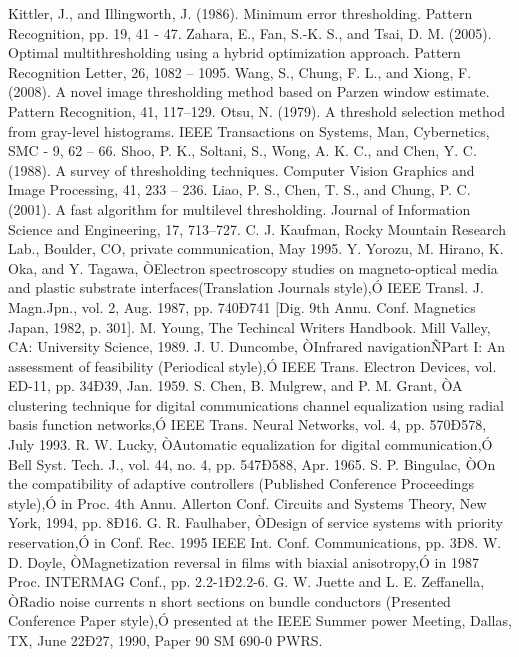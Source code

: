 \documentclass[a4paper, 10pt, conference]{ieeeconf}
\begin{document}
\begin{thebibliography}{99}

 Kittler, J., and Illingworth, J. (1986). Minimum error thresholding. Pattern Recognition, pp. 19, 41 - 47. 
 Zahara, E., Fan, S.-K. S., and Tsai, D. M. (2005). Optimal multithresholding using a hybrid optimization approach. Pattern Recognition Letter, 26, 1082 – 1095.
 Wang, S., Chung, F. L., and Xiong, F. (2008). A novel image thresholding method based on Parzen window estimate. Pattern Recognition, 41, 117–129.
 Otsu, N. (1979). A threshold selection method from gray-level histograms. IEEE Transactions on Systems, Man, Cybernetics, SMC - 9, 62 – 66.
 Shoo, P. K., Soltani, S., Wong, A. K. C., and Chen, Y. C. (1988). A survey of thresholding techniques. Computer Vision Graphics and Image Processing, 41, 233 – 236.
 Liao, P. S., Chen, T. S., and Chung, P. C. (2001). A fast algorithm for multilevel thresholding. Journal of Information Science and Engineering, 17, 713–727.
 C. J. Kaufman, Rocky Mountain Research Lab., Boulder, CO, private communication, May 1995.
 Y. Yorozu, M. Hirano, K. Oka, and Y. Tagawa, ÒElectron spectroscopy studies on magneto-optical media and plastic substrate interfaces(Translation Journals style),Ó IEEE Transl. J. Magn.Jpn., vol. 2, Aug. 1987, pp. 740Ð741 [Dig. 9th Annu. Conf. Magnetics Japan, 1982, p. 301].
 M. Young, The Techincal Writers Handbook.  Mill Valley, CA: University Science, 1989.
 J. U. Duncombe, ÒInfrared navigationÑPart I: An assessment of feasibility (Periodical style),Ó IEEE Trans. Electron Devices, vol. ED-11, pp. 34Ð39, Jan. 1959.
 S. Chen, B. Mulgrew, and P. M. Grant, ÒA clustering technique for digital communications channel equalization using radial basis function networks,Ó IEEE Trans. Neural Networks, vol. 4, pp. 570Ð578, July 1993.
 R. W. Lucky, ÒAutomatic equalization for digital communication,Ó Bell Syst. Tech. J., vol. 44, no. 4, pp. 547Ð588, Apr. 1965.
 S. P. Bingulac, ÒOn the compatibility of adaptive controllers (Published Conference Proceedings style),Ó in Proc. 4th Annu. Allerton Conf. Circuits and Systems Theory, New York, 1994, pp. 8Ð16.
 G. R. Faulhaber, ÒDesign of service systems with priority reservation,Ó in Conf. Rec. 1995 IEEE Int. Conf. Communications, pp. 3Ð8.
 W. D. Doyle, ÒMagnetization reversal in films with biaxial anisotropy,Ó in 1987 Proc. INTERMAG Conf., pp. 2.2-1Ð2.2-6.
 G. W. Juette and L. E. Zeffanella, ÒRadio noise currents n short sections on bundle conductors (Presented Conference Paper style),Ó presented at the IEEE Summer power Meeting, Dallas, TX, June 22Ð27, 1990, Paper 90 SM 690-0 PWRS.

\end{thebibliography}
\end{document}
